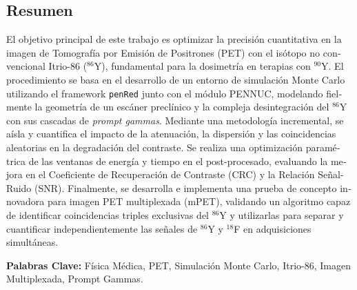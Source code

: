 
\begin{otherlanguage}{spanish}
	\chapter*{Resumen}
	El objetivo principal de este trabajo es optimizar la precisión cuantitativa en la imagen de Tomografía por Emisión de Positrones (PET) con el isótopo no convencional Itrio-86 ($^{86}$Y), fundamental para la dosimetría en terapias con $^{90}$Y. El procedimiento se basa en el desarrollo de un entorno de simulación Monte Carlo utilizando el framework \texttt{penRed} junto con el módulo PENNUC, modelando fielmente la geometría de un escáner preclínico y la compleja desintegración del $^{86}$Y con sus cascadas de \textit{prompt gammas}. Mediante una metodología incremental, se aísla y cuantifica el impacto de la atenuación, la dispersión y las coincidencias aleatorias en la degradación del contraste. Se realiza una optimización paramétrica de las ventanas de energía y tiempo en el post-procesado, evaluando la mejora en el Coeficiente de Recuperación de Contraste (CRC) y la Relación Señal-Ruido (SNR). Finalmente, se desarrolla e implementa una prueba de concepto innovadora para imagen PET multiplexada (mPET), validando un algoritmo capaz de identificar coincidencias triples exclusivas del $^{86}$Y y utilizarlas para separar y cuantificar independientemente las señales de $^{86}$Y y $^{18}$F en adquisiciones simultáneas.

	\vspace{0.5cm}
	\textbf{Palabras Clave:} Física Médica, PET, Simulación Monte Carlo, Itrio-86, Imagen Multiplexada, Prompt Gammas.
\end{otherlanguage}

\vfill

